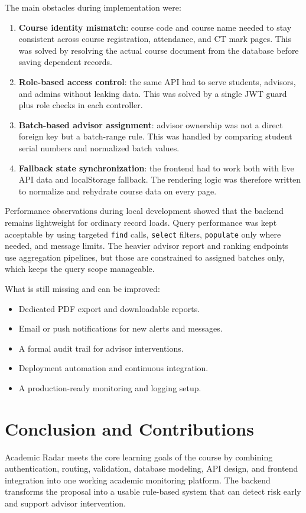 \documentclass[12pt,a4paper]{article}
\begin{document}
The main obstacles during implementation were:
\begin{enumerate}[leftmargin=*]
  \item \textbf{Course identity mismatch}: course code and course name needed to stay consistent across course registration, attendance, and CT mark pages. This was solved by resolving the actual course document from the database before saving dependent records.
  \item \textbf{Role-based access control}: the same API had to serve students, advisors, and admins without leaking data. This was solved by a single JWT guard plus role checks in each controller.
  \item \textbf{Batch-based advisor assignment}: advisor ownership was not a direct foreign key but a batch-range rule. This was handled by comparing student serial numbers and normalized batch values.
  \item \textbf{Fallback state synchronization}: the frontend had to work both with live API data and localStorage fallback. The rendering logic was therefore written to normalize and rehydrate course data on every page.
\end{enumerate}

Performance observations during local development showed that the backend remains lightweight for ordinary record loads. Query performance was kept acceptable by using targeted \texttt{find} calls, \texttt{select} filters, \texttt{populate} only where needed, and message limits. The heavier advisor report and ranking endpoints use aggregation pipelines, but those are constrained to assigned batches only, which keeps the query scope manageable.

What is still missing and can be improved:
\begin{itemize}[leftmargin=*]
  \item Dedicated PDF export and downloadable reports.
  \item Email or push notifications for new alerts and messages.
  \item A formal audit trail for advisor interventions.
  \item Deployment automation and continuous integration.
  \item A production-ready monitoring and logging setup.
\end{itemize}

\section{Conclusion and Contributions}
Academic Radar meets the core learning goals of the course by combining authentication, routing, validation, database modeling, API design, and frontend integration into one working academic monitoring platform. The backend transforms the proposal into a usable rule-based system that can detect risk early and support advisor intervention.
\end{document}
